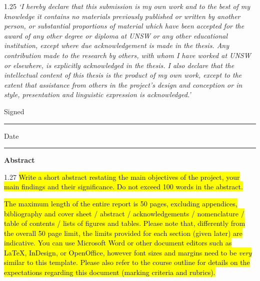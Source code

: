 \documentclass[12pt,letterpaper]{article}
\newcommand{\placeholder}[1]{\hl{#1}}
\newcommand{\reportheading}[1]{\begin{center}\textbf{#1}\end{center}}
\begin{document}
\begin{spacing}{1.25}
\textit{`I hereby declare that this submission is my own work and to the best of my knowledge it contains no materials previously published or written by another person, or substantial proportions of material which have been accepted for the award of any other degree or diploma at UNSW or any other educational institution, except where due acknowledgement is made in the thesis. Any contribution made to the research by others, with whom I have worked at UNSW or elsewhere, is explicitly acknowledged in the thesis. I also declare that the intellectual content of this thesis is the product of my own work, except to the extent that assistance from others in the project's design and conception or in style, presentation and linguistic expression is acknowledged.'}
\end{spacing}

\vspace{0.36in}
Signed\hspace{1em}\rule{2.1in}{0.4pt}\par

\vspace{0.36in}
Date\hspace{1.55em}\rule{1.6in}{0.4pt}

\clearpage

\vspace*{0.02in}
\reportheading{Abstract}

\vspace{0.38in}

\begin{spacing}{1.27}
\placeholder{Write a short abstract restating the main objectives of the project, your main findings and their significance. Do not exceed 100 words in the abstract.}\par

\vspace{0.33in}

\placeholder{The maximum length of the entire report is 50 pages, excluding appendices, bibliography and cover sheet / abstract / acknowledgements / nomenclature / table of contents / lists of figures and tables. Please note that, differently from the overall 50 page limit, the limits provided for each section (given later) are indicative. You can use Microsoft Word or other document editors such as LaTeX, InDesign, or OpenOffice, however font sizes and margins need to be \textit{very} similar to this template. Please also refer to the course outline for details on the expectations regarding this document (marking criteria and rubrics).}
\end{spacing}
\end{document}
